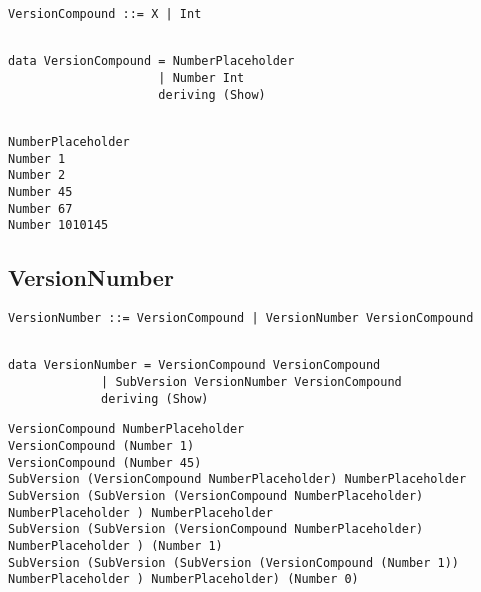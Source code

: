 \documentclass[11pt]{article}
\begin{document}
\begin{lstlisting}[style=Haskell,caption=BNF]
VersionCompound ::= X | Int
\end{lstlisting}
\begin{lstlisting}[caption=Haskell]  % Start your code-block

data VersionCompound = NumberPlaceholder
                     | Number Int 
                     deriving (Show)
\end{lstlisting}
\begin{lstlisting}[caption=Examples,style=Examples]  % Start your code-block

NumberPlaceholder	
Number 1	
Number 2	
Number 45	
Number 67	
Number 1010145
\end{lstlisting}

\subsection{VersionNumber}

\begin{lstlisting}[caption=BNF]
VersionNumber ::= VersionCompound | VersionNumber VersionCompound
\end{lstlisting}	

\begin{lstlisting}

data VersionNumber = VersionCompound VersionCompound
             | SubVersion VersionNumber VersionCompound
             deriving (Show)
\end{lstlisting}

	\begin{lstlisting}[style=Examples]
VersionCompound NumberPlaceholder                      			
VersionCompound (Number 1)             		
VersionCompound (Number 45)            			
SubVersion (VersionCompound NumberPlaceholder) NumberPlaceholder               			
SubVersion (SubVersion (VersionCompound NumberPlaceholder) NumberPlaceholder ) NumberPlaceholder       			
SubVersion (SubVersion (VersionCompound NumberPlaceholder) NumberPlaceholder ) (Number 1)        		
SubVersion (SubVersion (SubVersion (VersionCompound (Number 1)) NumberPlaceholder ) NumberPlaceholder) (Number 0)   
	\end{lstlisting}
\end{document}
